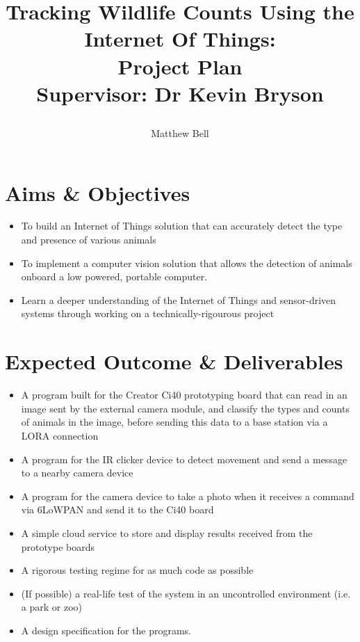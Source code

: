 \documentclass{article}
\title{\protect\parbox{\textwidth}{\protect\centering %
Tracking Wildlife Counts Using the Internet Of Things: \\
Project Plan \\
\large Supervisor: Dr Kevin Bryson}} \author{Matthew Bell}
\begin{document}
 \maketitle

\section*{Aims \& Objectives}
\begin{itemize}
    \item To build an Internet of Things solution
        that can accurately detect the type and presence of various animals
    \item To implement a computer vision solution that allows the detection of
        animals onboard a low powered, portable computer.
    \item Learn a deeper understanding of the Internet of Things and
        sensor-driven systems through working on a technically-rigourous project
\end{itemize}

\section*{Expected Outcome \& Deliverables}
\begin{itemize}
    \item A program built for the Creator Ci40 prototyping board that can read
        in an image sent by the external camera module, and classify the types
        and counts of animals in the image, before sending this data to a base
        station via a LORA connection
    \item A program for the IR clicker device to detect movement and send a
        message to a nearby camera device
    \item A program for the camera device to take a photo when it receives a
        command via 6LoWPAN and send it to the Ci40 board
    \item A simple cloud service to store and display results received from the
        prototype boards
    \item A rigorous testing regime for as much code as possible
    \item (If possible) a real-life test of the system in an uncontrolled
        environment (i.e. a park or zoo)
    \item A design specification for the programs.
\end{itemize}
\end{document}
